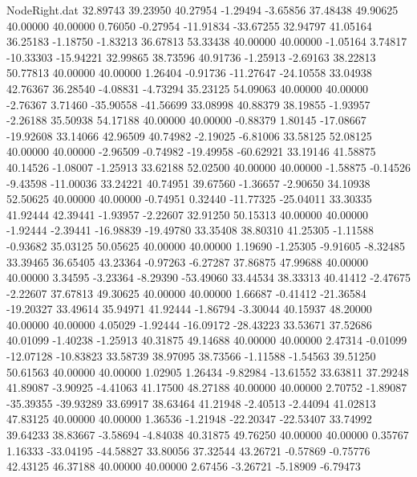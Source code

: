 \begin{filecontents}{NodeRight.dat}
  32.89743   39.23950   40.27954    -1.29494   -3.65856   37.48438   49.90625   40.00000   40.00000    0.76050   -0.27954  -11.91834  -33.67255
  32.94797   41.05164   36.25183    -1.18750   -1.83213   36.67813   53.33438   40.00000   40.00000   -1.05164    3.74817  -10.33303  -15.94221
  32.99865   38.73596   40.91736    -1.25913   -2.69163   38.22813   50.77813   40.00000   40.00000    1.26404   -0.91736  -11.27647  -24.10558
  33.04938   42.76367   36.28540    -4.08831   -4.73294   35.23125   54.09063   40.00000   40.00000   -2.76367    3.71460  -35.90558  -41.56699
  33.08998   40.88379   38.19855    -1.93957   -2.26188   35.50938   54.17188   40.00000   40.00000   -0.88379    1.80145  -17.08667  -19.92608
  33.14066   42.96509   40.74982    -2.19025   -6.81006   33.58125   52.08125   40.00000   40.00000   -2.96509   -0.74982  -19.49958  -60.62921
  33.19146   41.58875   40.14526    -1.08007   -1.25913   33.62188   52.02500   40.00000   40.00000   -1.58875   -0.14526   -9.43598  -11.00036
  33.24221   40.74951   39.67560    -1.36657   -2.90650   34.10938   52.50625   40.00000   40.00000   -0.74951    0.32440  -11.77325  -25.04011
  33.30335   41.92444   42.39441    -1.93957   -2.22607   32.91250   50.15313   40.00000   40.00000   -1.92444   -2.39441  -16.98839  -19.49780
  33.35408   38.80310   41.25305    -1.11588   -0.93682   35.03125   50.05625   40.00000   40.00000    1.19690   -1.25305   -9.91605   -8.32485
  33.39465   36.65405   43.23364    -0.97263   -6.27287   37.86875   47.99688   40.00000   40.00000    3.34595   -3.23364   -8.29390  -53.49060
  33.44534   38.33313   40.41412    -2.47675   -2.22607   37.67813   49.30625   40.00000   40.00000    1.66687   -0.41412  -21.36584  -19.20327
  33.49614   35.94971   41.92444    -1.86794   -3.30044   40.15937   48.20000   40.00000   40.00000    4.05029   -1.92444  -16.09172  -28.43223
  33.53671   37.52686   40.01099    -1.40238   -1.25913   40.31875   49.14688   40.00000   40.00000    2.47314   -0.01099  -12.07128  -10.83823
  33.58739   38.97095   38.73566    -1.11588   -1.54563   39.51250   50.61563   40.00000   40.00000    1.02905    1.26434   -9.82984  -13.61552
  33.63811   37.29248   41.89087    -3.90925   -4.41063   41.17500   48.27188   40.00000   40.00000    2.70752   -1.89087  -35.39355  -39.93289
  33.69917   38.63464   41.21948    -2.40513   -2.44094   41.02813   47.83125   40.00000   40.00000    1.36536   -1.21948  -22.20347  -22.53407
  33.74992   39.64233   38.83667    -3.58694   -4.84038   40.31875   49.76250   40.00000   40.00000    0.35767    1.16333  -33.04195  -44.58827
  33.80056   37.32544   43.26721    -0.57869   -0.75776   42.43125   46.37188   40.00000   40.00000    2.67456   -3.26721   -5.18909   -6.79473

\end{filecontents}
